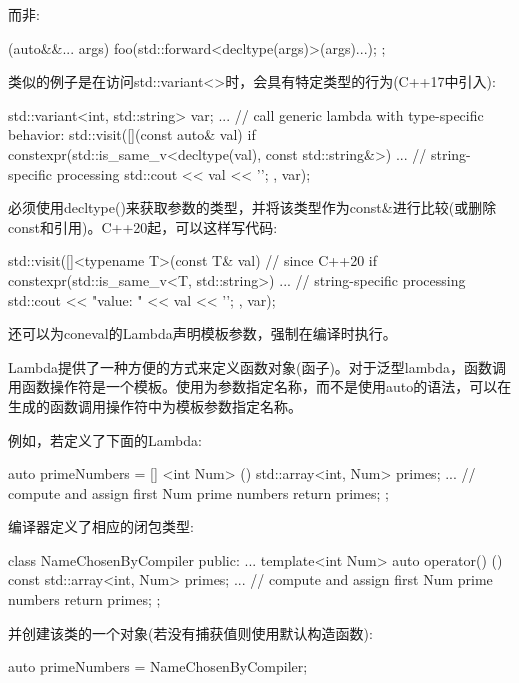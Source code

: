 而非:

\begin{cpp}
[] (auto&&... args) {
	foo(std::forward<decltype(args)>(args)...);
};
\end{cpp}

类似的例子是在访问std::variant<>时，会具有特定类型的行为(C++17中引入):

\begin{cpp}
std::variant<int, std::string> var;
...
// call generic lambda with type-specific behavior:
std::visit([](const auto& val) {
				if constexpr(std::is_same_v<decltype(val), const std::string&>) {
					... // string-specific processing
				}
				std::cout << val << '\n';
			},
			var);
\end{cpp}

必须使用decltype()来获取参数的类型，并将该类型作为const\&进行比较(或删除const和引用)。C++20起，可以这样写代码:

\begin{cpp}
std::visit([]<typename T>(const T& val) { // since C++20
				if constexpr(std::is_same_v<T, std::string>) {
					... // string-specific processing
				}
				std::cout << "value: " << val << '\n';
			},
			var);
\end{cpp}

还可以为coneval的Lambda声明模板参数，强制在编译时执行。


Lambda提供了一种方便的方式来定义函数对象(函子)。对于泛型lambda，函数调用函数操作符是一个模板。使用为参数指定名称，而不是使用auto的语法，可以在生成的函数调用操作符中为模板参数指定名称。

例如，若定义了下面的Lambda:

\begin{cpp}
auto primeNumbers = [] <int Num> () {
						std::array<int, Num> primes{};
						... // compute and assign first Num prime numbers
						return primes;
					};
\end{cpp}

编译器定义了相应的闭包类型:

\begin{cpp}
class NameChosenByCompiler {
public:
	...
	template<int Num>
	auto operator() () const {
		std::array<int, Num> primes{};
		... // compute and assign first Num prime numbers
		return primes;
	}
};
\end{cpp}

并创建该类的一个对象(若没有捕获值则使用默认构造函数):

\begin{cpp}
auto primeNumbers = NameChosenByCompiler{};
\end{cpp}

